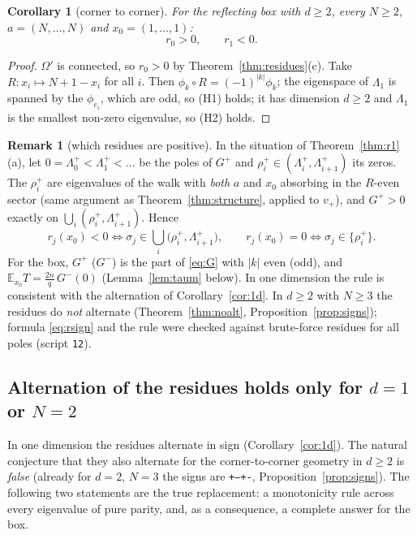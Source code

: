 \documentclass[11pt,a4paper]{article}
\newcommand{\E}{\mathbb E}
\theoremstyle{plain}
\newtheorem{corollary}[theorem]{Corollary}
\theoremstyle{definition}
\newtheorem{remark}[theorem]{Remark}
\numberwithin{equation}{section}
\begin{document}
\begin{corollary}[corner to corner]\label{cor:r1cc}
For the reflecting box with $d\ge2$, every $N\ge2$, $a=(N,\dots,N)$ and $x_0=(1,\dots,1)$:
\[
r_0>0,\qquad r_1<0 .
\]
\end{corollary}
\begin{proof}
$\Omega'$ is connected, so $r_0>0$ by Theorem~\ref{thm:residues}(c). Take $R:x_i\mapsto N+1-x_i$ for all $i$. Then $\phi_k\circ R=(-1)^{|k|}\phi_k$; the eigenspace of $\Lambda_1$ is spanned by the $\phi_{e_i}$, which are odd, so (H1) holds; it has dimension $d\ge2$ and $\Lambda_1$ is the smallest non-zero eigenvalue, so (H2) holds.
\end{proof}

\begin{remark}[which residues are positive]\label{rem:signrule}
In the situation of Theorem~\ref{thm:r1}(a), let $0=\Lambda^+_0<\Lambda^+_1<\dots$ be the poles of $G^+$ and $\rho^+_i\in(\Lambda^+_i,\Lambda^+_{i+1})$ its zeros. The $\rho_i^+$ are eigenvalues of the walk with \emph{both} $a$ and $x_0$ absorbing in the $R$-even sector (same argument as Theorem~\ref{thm:structure}, applied to $v_+$), and $G^+>0$ exactly on $\bigcup_i(\rho^+_i,\Lambda^+_{i+1})$. Hence
\[
r_j(x_0)<0\iff\sigma_j\in\bigcup_i\big(\rho^+_i,\Lambda^+_{i+1}\big),\qquad r_j(x_0)=0\iff\sigma_j\in\{\rho^+_i\}.
\]
For the box, $G^{+}$ ($G^-$) is the part of \eqref{eq:G} with $|k|$ even (odd), and $\E_{x_0}T=\frac{2n}{q}\,G^{-}(0)$ (Lemma~\ref{lem:taum} below). In one dimension the rule is consistent with the alternation of Corollary~\ref{cor:1d}. In $d\ge2$ with $N\ge3$ the residues do \emph{not} alternate (Theorem~\ref{thm:noalt}, Proposition~\ref{prop:signs}); formula \eqref{eq:rsign} and the rule were checked against brute-force residues for all poles (script \texttt{12}).
\end{remark}

\subsection{Alternation of the residues holds only for $d=1$ or $N=2$}\label{sec:noalt}

In one dimension the residues alternate in sign (Corollary~\ref{cor:1d}). The natural conjecture that they also alternate for the corner-to-corner geometry in $d\ge2$ is \emph{false} (already for $d=2$, $N=3$ the signs are \texttt{+--+-}, Proposition~\ref{prop:signs}). The following two statements are the true replacement: a monotonicity rule across every eigenvalue of pure parity, and, as a consequence, a complete answer for the box.
\end{document}
